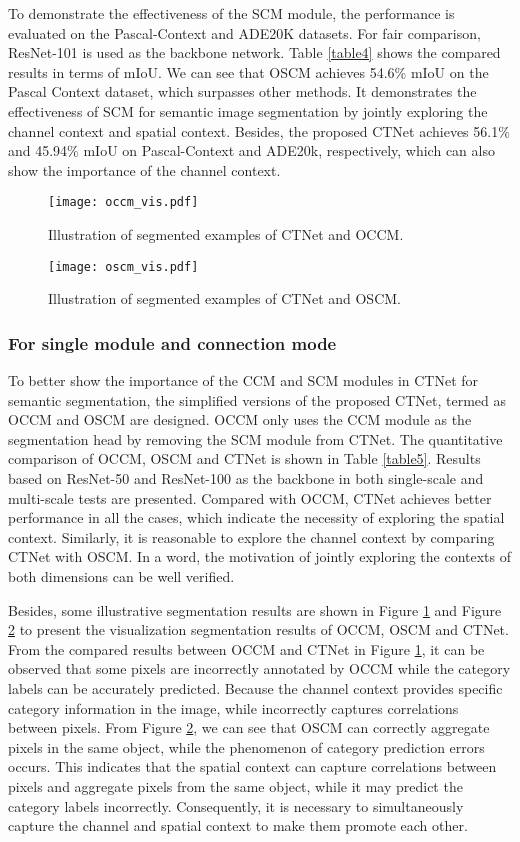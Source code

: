 \documentclass[10pt,journal,cspaper,compsoc]{IEEEtran}
\begin{document}
To demonstrate the effectiveness of the SCM module, the performance is evaluated on the Pascal-Context and ADE20K datasets. For fair comparison, ResNet-101 is used as the backbone network. Table \ref{table4} shows the compared results in terms of mIoU. We can see that OSCM achieves 54.6\% mIoU on the Pascal Context dataset, which surpasses other methods. It demonstrates the effectiveness of SCM for semantic image segmentation by jointly exploring the channel context and spatial context. Besides, the proposed CTNet achieves 56.1\% and 45.94\% mIoU on Pascal-Context and ADE20k, respectively, which can also show the importance of the channel context.
	
\begin{figure}
\centering
	\texttt{[image: occm\_vis.pdf]}
	\caption{Illustration of segmented examples of CTNet and OCCM.}
	\label{fig8}
\end{figure}
	
\begin{figure}
\centering
	\texttt{[image: oscm\_vis.pdf]}
	\caption{Illustration of segmented examples of CTNet and OSCM.}
	\label{fig9}
	\vspace{-4mm}
\end{figure}
	
	
\subsubsection{For single module and connection mode}
To better show the importance of the CCM and SCM modules in CTNet for semantic segmentation, the simplified versions of the proposed CTNet, termed as OCCM and OSCM are designed. OCCM only uses the CCM module as the segmentation head by removing the SCM module from CTNet. The quantitative comparison of OCCM, OSCM and CTNet is shown in Table \ref{table5}. Results based on ResNet-50 and ResNet-100 as the backbone in both single-scale and multi-scale tests are presented. Compared with OCCM, CTNet achieves better performance in all the cases, which indicate the necessity of exploring the spatial context. Similarly, it is reasonable to explore the channel context by comparing CTNet with OSCM. In a word, the motivation of jointly exploring the contexts of both dimensions can be well verified.
	
Besides, some illustrative segmentation results are shown in Figure \ref{fig8} and Figure \ref{fig9} to present the visualization segmentation results of OCCM, OSCM and CTNet. From the compared results between OCCM and CTNet in Figure \ref{fig8}, it can be observed that some pixels are incorrectly annotated by OCCM while the category labels can be accurately predicted. Because the channel context provides specific category information in the image, while incorrectly captures correlations between pixels. From Figure \ref{fig9}, we can see that OSCM can correctly aggregate pixels in the same object, while the phenomenon of category prediction errors occurs. This indicates that the spatial context can capture correlations between pixels and aggregate pixels from the same object, while it may predict the category labels incorrectly. Consequently, it is necessary to simultaneously capture the channel and spatial context to make them promote each other.
	
\end{document}
